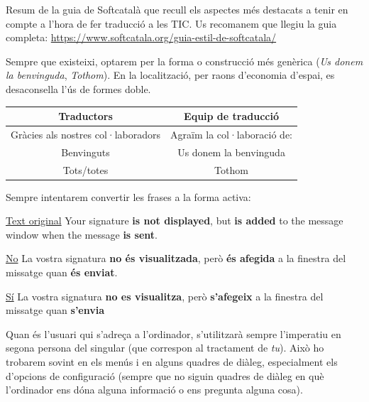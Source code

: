 \documentclass[9pt]{cheatsheet}
\begin{document}
Resum de la guia de Softcatalà que recull els aspectes més destacats a tenir en compte  a l'hora de fer traducció a les TIC. Us recomanem que llegiu la guia completa: \url{https://www.softcatala.org/guia-estil-de-softcatala/}

\begin{multicols*}{3}



Sempre que existeixi, optarem per la forma o construcció més genèrica (\emph{Us donem la benvinguda}, \emph{Tothom}). En la localització, per raons d'economia d'espai, es desaconsella l'ús de formes doble.

\begin{tabular}{| c | c |}
 \hline
 Traductors & Equip de traducció \\
 \hline
 Gràcies als nostres col·laboradors & Agraïm la col·laboració de: \\
 \hline
 Benvinguts & Us donem la benvinguda \\
 \hline
 Tots/totes & Tothom \\
 \hline
\end{tabular}


Sempre intentarem convertir les frases a la forma activa:

\underline {Text original} Your signature \textbf{is not displayed}, but \textbf{is added} to the message window when the message \textbf{is sent}.

\underline {No} La vostra signatura \textbf{no és visualitzada}, però \textbf{és afegida} a la finestra del missatge quan \textbf{és enviat}.

\underline {Sí} La vostra signatura \textbf{no es visualitza}, però \textbf{s'afegeix} a la finestra del missatge quan \textbf{s'envia}



Quan és l'usuari qui s'adreça a l'ordinador, s'utilitzarà sempre l'imperatiu en segona persona del singular (que correspon al tractament de \emph{tu}). Això ho trobarem sovint en els menús i en alguns quadres de diàleg, especialment els d'opcions de configuració (sempre que no siguin quadres de diàleg en què l'ordinador ens dóna alguna informació o ens pregunta alguna cosa).


\end{multicols*}
\end{document}
